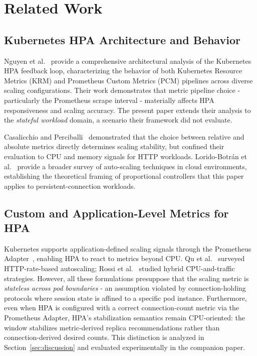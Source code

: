 \documentclass[twocolumn]{svjour3}
\begin{document}
\section{Related Work}
\label{sec:related}

\subsection{Kubernetes HPA Architecture and Behavior}

Nguyen et al.~\cite{nguyen2020hpa} provide a comprehensive architectural analysis of the
Kubernetes HPA feedback loop, characterizing the behavior of both Kubernetes Resource Metrics
(KRM) and Prometheus Custom Metrics (PCM) pipelines across diverse scaling configurations.
Their work demonstrates that metric pipeline choice - particularly the Prometheus scrape
interval - materially affects HPA responsiveness and scaling accuracy. The present paper
extends their analysis to the \textit{stateful workload} domain, a scenario their framework
did not evaluate.

Casalicchio and Perciballi~\cite{casalicchio2019auto} demonstrated that the choice between
relative and absolute metrics directly determines scaling stability, but confined their
evaluation to CPU and memory signals for HTTP workloads. Lorido-Botr{\'a}n et
al.~\cite{lorido2014auto} provide a broader survey of auto-scaling techniques in cloud
environments, establishing the theoretical framing of proportional controllers that this
paper applies to persistent-connection workloads.

\subsection{Custom and Application-Level Metrics for HPA}

Kubernetes supports application-defined scaling signals through the Prometheus
Adapter~\cite{prometheus_adapter}, enabling HPA to react to metrics beyond CPU. Qu et
al.~\cite{qu2018auto} surveyed HTTP-rate-based autoscaling; Rossi et al.~\cite{rossi2020horizontal}
studied hybrid CPU-and-traffic strategies. However, all these formulations presuppose that
the scaling metric is \textit{stateless across pod boundaries} - an assumption violated
by connection-holding protocols where session state is affined to a specific pod instance.
Furthermore, even when HPA is configured with a correct connection-count metric via the
Prometheus Adapter, HPA's stabilization semantics remain CPU-oriented: the window stabilizes
metric-derived replica recommendations rather than connection-derived desired counts. This
distinction is analyzed in Section~\ref{sec:discussion} and evaluated experimentally in the
companion paper.
\end{document}
